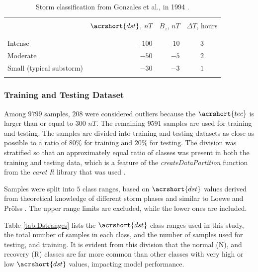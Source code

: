 \documentclass[sn-mathphys-num]{sn-jnl}%
\begin{document}
\begin{table}[!ht]
    \centering
    \caption{Storm classification from Gonzales et al., in 1994 \cite{gonzalez1994geomagnetic}.}
    \label{tab:gonzalez1994}
    \begin{tabular}{lrrc}
        \hline
        \\
         & $\acrshort{dst}$, $nT$ & $B_{z}$, $nT$ & $\Delta T$, hours \\
        \\
        \hline
        \\
        Intense & $-100$ & $-10$ & $3$ \\
        Moderate & $-50$ & $-5$ & $2$ \\
        Small (typical substorm) & $-30$ & $-3$ & $1$ \\
        \\
        \hline
    \end{tabular}
\end{table}

\subsubsection{Training and Testing Dataset}

Among $9799$ samples, $208$ were considered outliers because the $\acrshort{tec}$ is larger than or equal to $300$ $nT$. The remaining $9591$ samples are used for training and testing. The samples are divided into training and testing datasets as close as possible to a ratio of $80\%$ for training and $20\%$ for testing. The division was stratified so that an approximately equal ratio of classes was present in both the training and testing data, which is a feature of the \textit{createDataPartition} function from the \textit{caret} \textit{R} library that was used \cite{KuhnDataSplitting2024, hyndman2018forecasting, createDataPartition2024}.

Samples were split into $5$ class ranges, based on $\acrshort{dst}$ values derived from theoretical knowledge of different storm phases and similar to Loewe and Prölss \cite{loewe1997classification}. The upper range limits are excluded, while the lower ones are included. 

Table \ref{tab:Dstranges} lists the $\acrshort{dst}$ class ranges used in this study, the total number of samples in each class, and the number of samples used for testing, and training. It is evident from this division that the normal (N), and recovery (R) classes are far more common than other classes with very high or low $\acrshort{dst}$ values, impacting model performance.
\end{document}
